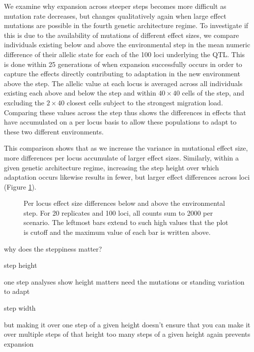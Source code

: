 We examine why expansion across steeper steps becomes more difficult as mutation rate decreases, but changes qualitatively again when large effect mutations are possible in the fourth genetic architecture regime. To investigate if this is due to the availability of mutations of different effect sizes, we compare individuals existing below and above the environmental step in the mean numeric difference of their allelic state for each of the 100 loci underlying the QTL. This is done within 25 generations of when expansion successfully occurs in order to capture the effects directly contributing to adaptation in the new environment above the step. The allelic value at each locus is averaged across all individuals existing each above and below the step and within $40\times40$ cells of the step, and excluding the $2\times40$ closest cells subject to the strongest migration load. Comparing these values across the step thus shows the differences in effects that have accumulated on a per locus basis to allow these populations to adapt to these two different environments.

This comparison shows that as we increase the variance in mutational effect size, more differences per locus accumulate of larger effect sizes. Similarly, within a given genetic architecture regime, increasing the step height over which adaptation occurs likewise results in fewer, but larger effect differences across loci (Figure \ref{fig:effectsizes}).



\begin{figure}[h]
\centering
{}
\caption[Per locus effect size differences.]{Per locus effect size differences below and above the environmental step. For 20 replicates and 100 loci, all counts sum to 2000 per scenario. The leftmost bars extend to such high values that the plot is cutoff and the maximum value of each bar is written above.}
\label{fig:effectsizes}
\end{figure}




why does the steppiness matter?

step height

	one step analyses show height matters
	need the mutations or standing variation to adapt


step width

	but making it over one step of a given height doesn't ensure that you can make it over multiple steps of that height
	too many steps of a given height again prevents expansion
	
